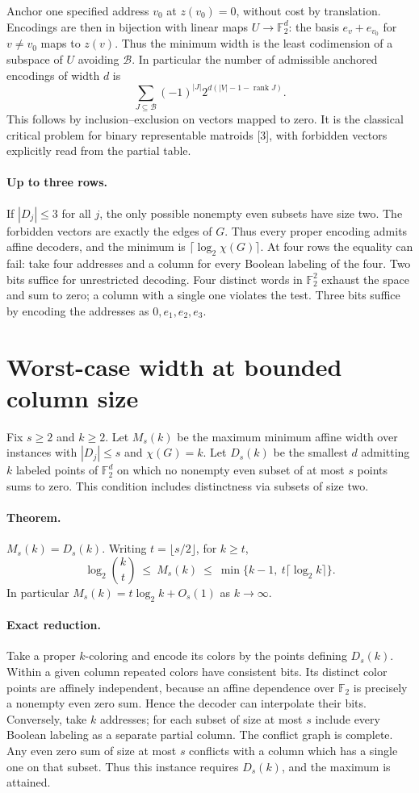 \documentclass[11pt]{article}
\newcommand{\F}{\mathbb F_2}
\begin{document}
Anchor one specified address $v_0$ at $z(v_0)=0$, without cost by translation. Encodings are then in bijection with linear maps $U\to\F^d$: the basis $e_v+e_{v_0}$ for $v\ne v_0$ maps to $z(v)$. Thus the minimum width is the least codimension of a subspace of $U$ avoiding $\mathcal B$. In particular the number of admissible anchored encodings of width $d$ is
\[
 \sum_{J\subseteq\mathcal B}(-1)^{|J|}
           2^{d(|V|-1-\operatorname{rank}J)} .
\]
This follows by inclusion--exclusion on vectors mapped to zero. It is the classical critical problem for binary representable matroids [3], with forbidden vectors explicitly read from the partial table.

\paragraph{Up to three rows.} If $|D_j|\le3$ for all $j$, the only possible nonempty even subsets have size two. The forbidden vectors are exactly the edges of $G$. Thus every proper encoding admits affine decoders, and the minimum is $\lceil\log_2\chi(G)\rceil$. At four rows the equality can fail: take four addresses and a column for every Boolean labeling of the four. Two bits suffice for unrestricted decoding. Four distinct words in $\F^2$ exhaust the space and sum to zero; a column with a single one violates the test. Three bits suffice by encoding the addresses as $0,e_1,e_2,e_3$.

\section{Worst-case width at bounded column size}
Fix $s\ge2$ and $k\ge2$. Let $M_s(k)$ be the maximum minimum affine width over instances with $|D_j|\le s$ and $\chi(G)=k$. Let $D_s(k)$ be the smallest $d$ admitting $k$ labeled points of $\F^d$ on which no nonempty even subset of at most $s$ points sums to zero. This condition includes distinctness via subsets of size two.

\paragraph{Theorem.} $M_s(k)=D_s(k)$. Writing $t=\lfloor s/2\rfloor$, for $k\ge t$,
\[
       \log_2\binom kt\ \le\ M_s(k)\
       \le\ \min\{k-1,\ t\lceil\log_2 k\rceil\}.
\]
In particular $M_s(k)=t\log_2 k+O_s(1)$ as $k\to\infty$.

\paragraph{Exact reduction.}
Take a proper $k$-coloring and encode its colors by the points defining $D_s(k)$. Within a given column repeated colors have consistent bits. Its distinct color points are affinely independent, because an affine dependence over $\F$ is precisely a nonempty even zero sum. Hence the decoder can interpolate their bits. Conversely, take $k$ addresses; for each subset of size at most $s$ include every Boolean labeling as a separate partial column. The conflict graph is complete. Any even zero sum of size at most $s$ conflicts with a column which has a single one on that subset. Thus this instance requires $D_s(k)$, and the maximum is attained.
\end{document}
